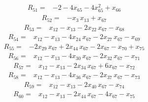 \documentclass[11pt]{article}
\begin{document}
\begin{equation*}\begin{aligned}
R_{51}={}&-2 - 4x_{65} - 4x_{65}^{2} + x_{66}
\end{aligned}\end{equation*}
\begin{equation*}\begin{aligned}
R_{52}={}&-x_{3}\,x_{13} + x_{67}
\end{aligned}\end{equation*}
\begin{equation*}\begin{aligned}
R_{53}={}&x_{12} - x_{13} - 2x_{22}\,x_{67} - x_{68}
\end{aligned}\end{equation*}
\begin{equation*}\begin{aligned}
R_{54}={}&x_{12} - x_{13} - 4x_{24}\,x_{67} - 2x_{27}\,x_{67} - x_{69}
\end{aligned}\end{equation*}
\begin{equation*}\begin{aligned}
R_{55}={}&-2x_{29}\,x_{67} + 2x_{44}\,x_{67} - 2x_{67} - x_{70} + x_{75}
\end{aligned}\end{equation*}
\begin{equation*}\begin{aligned}
R_{56}={}&x_{12} - x_{13} - 4x_{30}\,x_{67} - 2x_{32}\,x_{67} - x_{71}
\end{aligned}\end{equation*}
\begin{equation*}\begin{aligned}
R_{57}={}&x_{12} - x_{13} - 2x_{34}\,x_{67} + 6x_{67} - x_{72}
\end{aligned}\end{equation*}
\begin{equation*}\begin{aligned}
R_{58}={}&x_{12} - x_{13} - 4x_{36}\,x_{67} - 2x_{37}\,x_{67} - x_{73}
\end{aligned}\end{equation*}
\begin{equation*}\begin{aligned}
R_{59}={}&x_{12} - x_{13} - 2x_{40}\,x_{67} - x_{74}
\end{aligned}\end{equation*}
\begin{equation*}\begin{aligned}
R_{60}={}&x_{12} - x_{13} - 2x_{44}\,x_{67} - 4x_{67} - x_{75}
\end{aligned}\end{equation*}
\end{document}
